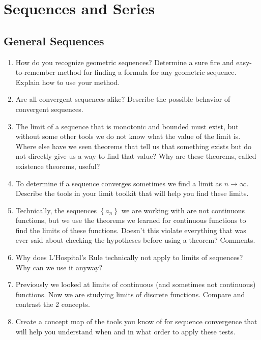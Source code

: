 
 
\chapter{Sequences and Series}



\section{General Sequences}\begin{enumerate}


\item How do you recognize geometric sequences?  Determine a sure fire and easy-to-remember method for finding a formula for any geometric sequence.  Explain how to use your method.

\item Are all convergent sequences alike?  Describe the possible behavior of convergent sequences.

\item The limit of a sequence that is monotonic and bounded must exist, but without some other tools we do not know what the value of the limit is.  Where else have we seen theorems that tell us that something exists but do not directly give us a way to find that value?  Why are these theorems, called existence theorems, useful?

\item To determine if a sequence converges sometimes we find a limit as $n \rightarrow  \infty$.  Describe the tools in your limit toolkit that will help you find these limits.

\item Technically, the sequences $
\left\{ {a_n } \right\}$  we are working with are not continuous functions, but we use the theorems we learned for continuous functions to find the limits of these functions.  Doesn't this violate everything that was ever said about checking the hypotheses before using a theorem?  Comments.

\item Why does L'Hospital's Rule technically not apply to limits of sequences?  Why can we use it anyway?

\item Previously we looked at limits of continuous (and sometimes not continuous) functions.  Now we are studying limits of discrete functions.  Compare and contrast the 2 concepts.

\item Create a concept map of the tools you know of for sequence convergence that will help you understand when and in what order to apply these tests.


\end{enumerate}
